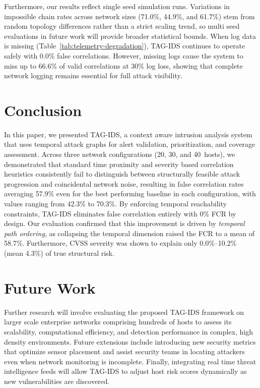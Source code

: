 \documentclass[runningheads]{llncs}
\begin{document}
Furthermore, our results reflect single seed simulation runs. Variations in impossible chain rates across network sizes (71.0\%, 44.9\%, and 61.7\%) stem from random topology differences rather than a strict scaling trend, so multi seed evaluations in future work will provide broader statistical bounds. When log data is missing (Table~\ref{tab:telemetry-degradation}), TAG-IDS continues to operate safely with 0.0\% false correlations. However, missing logs cause the system to miss up to 66.6\% of valid correlations at 30\% log loss, showing that complete network logging remains essential for full attack visibility.

\section{Conclusion}\label{sec:conclusion}

In this paper, we presented TAG-IDS, a context aware intrusion analysis system that uses temporal attack graphs for alert validation, prioritization, and coverage assessment. Across three network configurations (20, 30, and 40~hosts), we demonstrated that standard time proximity and severity based correlation heuristics consistently fail to distinguish between structurally feasible attack progression and coincidental network noise, resulting in false correlation rates averaging 57.9\% even for the best performing baseline in each configuration, with values ranging from 42.3\% to 70.3\%. By enforcing temporal reachability constraints, TAG-IDS eliminates false correlation entirely with 0\% FCR by design. Our evaluation confirmed that this improvement is driven by \emph{temporal path ordering}, as collapsing the temporal dimension raised the FCR to a mean of 58.7\%. Furthermore, CVSS severity was shown to explain only 0.0\%--10.2\% (mean 4.3\%) of true structural risk.

\section{Future Work}\label{sec:future-work}

Further research will involve evaluating the proposed TAG-IDS framework on larger scale enterprise networks comprising hundreds of hosts to assess its scalability, computational efficiency, and detection performance in complex, high density environments. Future extensions include introducing new security metrics that optimize sensor placement and assist security teams in locating attackers even when network monitoring is incomplete. Finally, integrating real time threat intelligence feeds will allow TAG-IDS to adjust host risk scores dynamically as new vulnerabilities are discovered.



\end{document}
